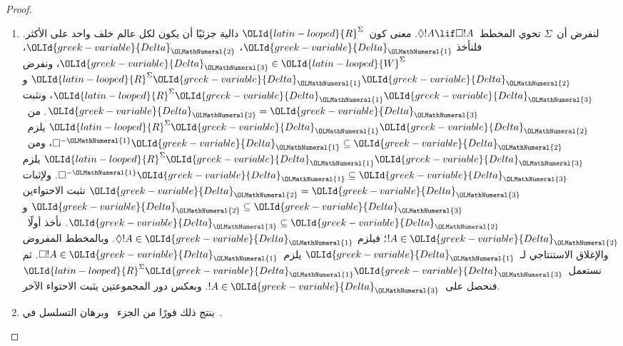 \documentclass[../../../include/open-logic-section]{subfiles}
\begin{document}
\begin{proof}
  \begin{enumerate}
  \item لنفرض أن~$\Sigma$ تحوي المخطط~$\Diamond !A \lif \Box !A$.
    معنى كون~$\OLId{latin-looped}{R}^\Sigma$ دالية جزئيًا أن يكون لكل عالم خلف واحد على الأكثر.
    فلنأخذ $ \OLId{greek-variable}{Delta}_\OLMathNumeral{1}$، $\OLId{greek-variable}{Delta}_\OLMathNumeral{2}$، $\OLId{greek-variable}{Delta}_\OLMathNumeral{3} \in \OLId{latin-looped}{W}^\Sigma$،
    ونفرض $\OLId{latin-looped}{R}^\Sigma \OLId{greek-variable}{Delta}_\OLMathNumeral{1}\OLId{greek-variable}{Delta}_\OLMathNumeral{2}$ و$\OLId{latin-looped}{R}^\Sigma \OLId{greek-variable}{Delta}_\OLMathNumeral{1}\OLId{greek-variable}{Delta}_\OLMathNumeral{3}$،
    ونثبت $ \OLId{greek-variable}{Delta}_\OLMathNumeral{2} = \OLId{greek-variable}{Delta}_\OLMathNumeral{3}$.
    من~$\OLId{latin-looped}{R}^\Sigma \OLId{greek-variable}{Delta}_\OLMathNumeral{1}\OLId{greek-variable}{Delta}_\OLMathNumeral{2}$ يلزم~$\Box^{-\OLMathNumeral{1}}\OLId{greek-variable}{Delta}_\OLMathNumeral{1} \subseteq \OLId{greek-variable}{Delta}_\OLMathNumeral{2}$،
    ومن~$\OLId{latin-looped}{R}^\Sigma \OLId{greek-variable}{Delta}_\OLMathNumeral{1}\OLId{greek-variable}{Delta}_\OLMathNumeral{3}$ يلزم
    $\Box^{-\OLMathNumeral{1}}\OLId{greek-variable}{Delta}_\OLMathNumeral{1} \subseteq \OLId{greek-variable}{Delta}_\OLMathNumeral{3}$.
    ولإثبات $ \OLId{greek-variable}{Delta}_\OLMathNumeral{2} = \OLId{greek-variable}{Delta}_\OLMathNumeral{3}$ نثبت الاحتواءين
    $\OLId{greek-variable}{Delta}_\OLMathNumeral{2} \subseteq \OLId{greek-variable}{Delta}_\OLMathNumeral{3}$ و$\OLId{greek-variable}{Delta}_\OLMathNumeral{3} \subseteq \OLId{greek-variable}{Delta}_\OLMathNumeral{2}$.
    نأخذ أولًا~$!A \in \OLId{greek-variable}{Delta}_\OLMathNumeral{2}$؛ فيلزم $\Diamond!A \in \OLId{greek-variable}{Delta}_\OLMathNumeral{1}$.
    وبالمخطط المفروض والإغلاق الاستنتاجي لـ~$\OLId{greek-variable}{Delta}_\OLMathNumeral{1}$
    يلزم~$\Box!A \in \OLId{greek-variable}{Delta}_\OLMathNumeral{1}$.
    ثم نستعمل~$\OLId{latin-looped}{R}^\Sigma \OLId{greek-variable}{Delta}_\OLMathNumeral{1}\OLId{greek-variable}{Delta}_\OLMathNumeral{3}$ فنحصل على~$!A \in \OLId{greek-variable}{Delta}_\OLMathNumeral{3}$.
    وبعكس دور المجموعتين يثبت الاحتواء الآخر.

  \item ينتج ذلك فورًا من الجزء~ وبرهان
    التسلسل في~.


\end{enumerate}
\end{proof}
\end{document}
